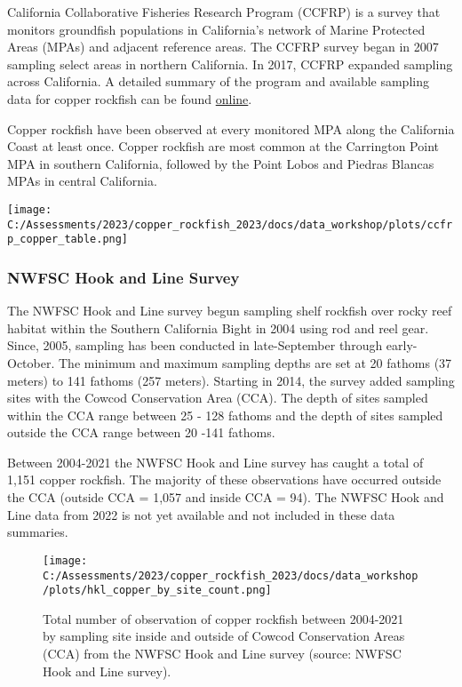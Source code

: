 \documentclass[
]{article}
\begin{document}
California Collaborative Fisheries Research Program (CCFRP) is a survey
that monitors groundfish populations in California's network of Marine
Protected Areas (MPAs) and adjacent reference areas. The CCFRP survey
began in 2007 sampling select areas in northern California. In 2017,
CCFRP expanded sampling across California. A detailed summary of the
program and available sampling data for copper rockfish can be found
\href{https://www.pcouncil.org/documents/2022/05/f-3-attachment-5-california-collaborative-fisheries-research-program-data-availability-for-stock-assessments.pdf/}{online}.

Copper rockfish have been observed at every monitored MPA along the
California Coast at least once. Copper rockfish are most common at the
Carrington Point MPA in southern California, followed by the Point Lobos
and Piedras Blancas MPAs in central California.

\texttt{[image: C:/Assessments/2023/copper\_rockfish\_2023/docs/data\_workshop/plots/ccfrp\_copper\_table.png]}\\

\hypertarget{nwfsc-hook-and-line-survey}{%
\subsubsection{NWFSC Hook and Line
Survey}\label{nwfsc-hook-and-line-survey}}

The NWFSC Hook and Line survey begun sampling shelf rockfish over rocky
reef habitat within the Southern California Bight in 2004 using rod and
reel gear. Since, 2005, sampling has been conducted in late-September
through early-October. The minimum and maximum sampling depths are set
at 20 fathoms (37 meters) to 141 fathoms (257 meters). Starting in 2014,
the survey added sampling sites with the Cowcod Conservation Area (CCA).
The depth of sites sampled within the CCA range between 25 - 128 fathoms
and the depth of sites sampled outside the CCA range between 20 -141
fathoms.

Between 2004-2021 the NWFSC Hook and Line survey has caught a total of
1,151 copper rockfish. The majority of these observations have occurred
outside the CCA (outside CCA = 1,057 and inside CCA = 94). The NWFSC
Hook and Line data from 2022 is not yet available and not included in
these data summaries.

\begin{figure}
\centering
\texttt{[image: C:/Assessments/2023/copper\_rockfish\_2023/docs/data\_workshop/plots/hkl\_copper\_by\_site\_count.png]}
\caption{Total number of observation of copper rockfish between
2004-2021 by sampling site inside and outside of Cowcod Conservation
Areas (CCA) from the NWFSC Hook and Line survey (source: NWFSC Hook and
Line survey).\label{fig:hkl-sites}}
\end{figure}
\end{document}
